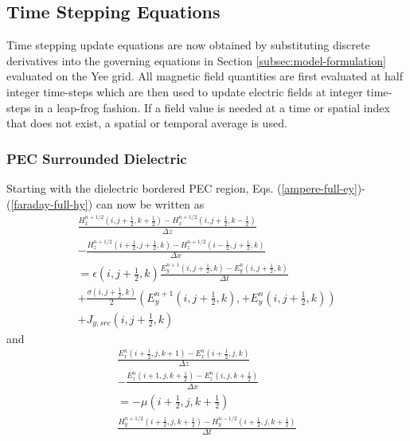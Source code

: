 \subsection{Time Stepping Equations}
\label{subsec:timestepeqs}
Time stepping update equations are now obtained by substituting discrete derivatives into the governing equations in Section \ref{subsec:model-formulation} evaluated on the Yee grid. All magnetic field quantities are first evaluated at half integer time-steps which are then used to update electric fields at integer time-steps in a leap-frog fashion. If a field value is needed at a time or spatial index that does not exist, a spatial or temporal average is used.

\subsubsection{PEC Surrounded Dielectric}
\label{subsubsec:pec-time}
Starting with the dielectric bordered PEC region, Eqs. (\ref{ampere-full-ey})-(\ref{faraday-full-hy}) can now be written as
\begin{multline}
	\frac{H_x^{n+1/2}(i,j+\frac{1}{2},k+\frac{1}{2}) - H_x^{n+1/2}(i,j+\frac{1}{2},k-\frac{1}{2})}{\Delta z} \\ - \frac{H_z^{n+1/2}(i+\frac{1}{2},j+\frac{1}{2},k) - H_z^{n+1/2}(i-\frac{1}{2},j+\frac{1}{2},k)}{\Delta x} \\ = \epsilon(i,j+\tfrac{1}{2},k)\frac{E_y^{n+1}(i,j+\frac{1}{2},k) - E_y^{n}(i,j+\frac{1}{2},k)}{\Delta t} \\ + \frac{\sigma(i,j+\tfrac{1}{2},k)}{2}(E_y^{n+1}(i,j+\tfrac{1}{2},k),+E_y^{n}(i,j+\tfrac{1}{2},k)) \\ + J_{y,src}(i,j+\tfrac{1}{2},k)
	\label{eq:discrete-faraday}
\end{multline}
and
\begin{multline}
	\frac{E_x^n(i+\tfrac{1}{2},j,k+1)-E_x^n(i+\tfrac{1}{2},j,k)}{\Delta z} \\ - \frac{E_z^n(i+1,j,k+\tfrac{1}{2}) - E_z^n(i,j,k+\tfrac{1}{2})}{\Delta x} \\ =-\mu(i+\tfrac{1}{2},j,k+\tfrac{1}{2}) \\ \frac{H_y^{n+1/2}(i+\tfrac{1}{2},j,k+\tfrac{1}{2})-H_y^{n-1/2}(i+\tfrac{1}{2},j,k+\tfrac{1}{2})}{\Delta t}
	\label{eq:discrete-ampere}
\end{multline}

